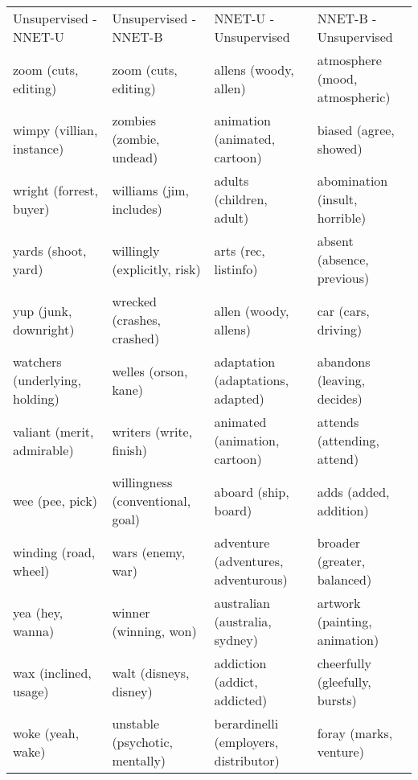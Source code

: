 \begin{landscape}
\begin{table}[]
	\scriptsize
	\centering
	\begin{tabular}{llll}
		Unsupervised - NNET-U          & Unsupervised - NNET-B              & NNET-U - Unsupervised                 & NNET-B - Unsupervised                \\
		zoom (cuts, editing)           & zoom (cuts, editing)               & allens (woody, allen)                 & atmosphere (mood, atmospheric)       \\
		wimpy (villian, instance)      & zombies (zombie, undead)           & animation (animated, cartoon)         & biased (agree, showed)               \\
		wright (forrest, buyer)        & williams (jim, includes)           & adults (children, adult)              & abomination (insult, horrible)       \\
		yards (shoot, yard)            & willingly (explicitly, risk)       & arts (rec, listinfo)                  & absent (absence, previous)           \\
		yup (junk, downright)          & wrecked (crashes, crashed)         & allen (woody, allens)                 & car (cars, driving)                  \\
		watchers (underlying, holding) & welles (orson, kane)               & adaptation (adaptations, adapted)     & abandons (leaving, decides)          \\
		valiant (merit, admirable)     & writers (write, finish)            & animated (animation, cartoon)         & attends (attending, attend)          \\
		wee (pee, pick)                & willingness (conventional, goal)   & aboard (ship, board)                  & adds (added, addition)               \\
		winding (road, wheel)          & wars (enemy, war)                  & adventure (adventures, adventurous)   & broader (greater, balanced)          \\
		yea (hey, wanna)               & winner (winning, won)              & australian (australia, sydney)        & artwork (painting, animation)        \\
		wax (inclined, usage)          & walt (disneys, disney)             & addiction (addict, addicted)          & cheerfully (gleefully, bursts)       \\
		woke (yeah, wake)              & unstable (psychotic, mentally)     & berardinelli (employers, distributor) & foray (marks, venture)               \\

\end{tabular}
\end{table}
\end{landscape}
